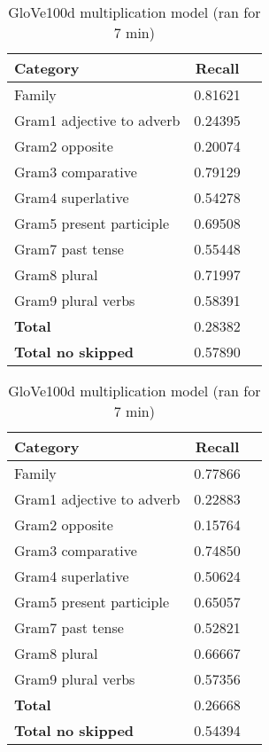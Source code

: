 \begin{center}
    
    \begin{table}[h!]
        \begin{tabular}{| l | c | r}
        	\hline
        	\textbf{Category} &    \textbf{Recall}\\ \hline
        	Family 						& 0.81621 \\
        	Gram1 adjective to adverb 	& 0.24395 \\
        	Gram2 opposite 				& 0.20074 \\
        	Gram3 comparative 			& 0.79129 \\
        	Gram4 superlative 			& 0.54278 \\
        	Gram5 present participle	& 0.69508 \\
        	Gram7 past tense 			& 0.55448 \\
        	Gram8 plural 				& 0.71997 \\
        	Gram9 plural verbs 			& 0.58391 \\
        	\textbf{Total}				& 0.28382 \\
        	\textbf{Total no skipped}	& 0.57890 \\ \hline
        \end{tabular}
    \caption{GloVe100d multiplication model (ran for 7 min)}
    \label{table:glove100d_addition}
    \end{table}
    
    \begin{table}[h!]
        \begin{tabular}{| l | c | r}
        	\hline
        	\textbf{Category} &    \textbf{Recall}\\ \hline
        	Family 						& 0.77866 \\
        	Gram1 adjective to adverb 	& 0.22883 \\
        	Gram2 opposite 				& 0.15764 \\
        	Gram3 comparative 			& 0.74850 \\
        	Gram4 superlative 			& 0.50624 \\
        	Gram5 present participle	& 0.65057 \\
        	Gram7 past tense 			& 0.52821 \\
        	Gram8 plural 				& 0.66667 \\
        	Gram9 plural verbs 			& 0.57356 \\
        	\textbf{Total}				& 0.26668 \\
        	\textbf{Total no skipped}	& 0.54394 \\ \hline
        \end{tabular}
    \caption{GloVe100d multiplication model (ran for 7 min)}
    \label{table:glove100d_addition}
    \end{table}
    

\end{center}
